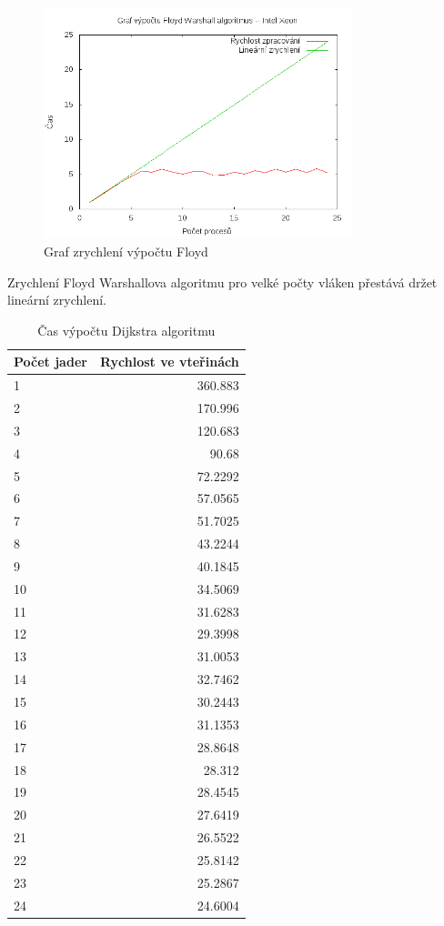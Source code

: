 \documentclass[a4paper,10pt]{article}
\begin{document}
\begin{figure}[H]
  \centering
    \includegraphics[width=0.8\textwidth]{graf_floyd_intel.png}
  \caption{Graf zrychlení výpočtu Floyd}
  \label{fig:floyd}
\end{figure}

Zrychlení Floyd Warshallova algoritmu pro velké počty vláken přestává držet lineární zrychlení.


\begin{table}[H]
  \centering
	\caption{Čas výpočtu Dijkstra algoritmu}
	\begin{tabular}{| l | r |}
\hline
Počet jader & Rychlost ve vteřinách \\ \hline
1 & 360.883 \\ \hline
2 & 170.996 \\ \hline
3 & 120.683 \\ \hline
4 & 90.68 \\ \hline
5 & 72.2292 \\ \hline
6 & 57.0565 \\ \hline
7 & 51.7025 \\ \hline
8 & 43.2244 \\ \hline
9 & 40.1845 \\ \hline
10 & 34.5069 \\ \hline
11 & 31.6283 \\ \hline
12 & 29.3998 \\ \hline
13 & 31.0053 \\ \hline
14 & 32.7462 \\ \hline
15 & 30.2443 \\ \hline
16 & 31.1353 \\ \hline
17 & 28.8648 \\ \hline
18 & 28.312 \\ \hline
19 & 28.4545 \\ \hline
20 & 27.6419 \\ \hline
21 & 26.5522 \\ \hline
22 & 25.8142 \\ \hline
23 & 25.2867 \\ \hline
24 & 24.6004 \\ \hline
	\end{tabular}
  \label{tab:djfl}
\end{table}
\end{document}
